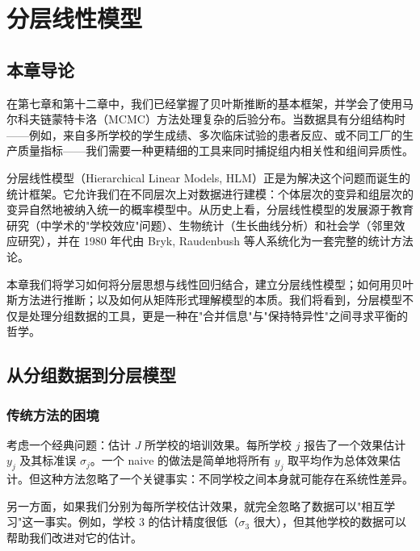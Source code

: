 
\chapter{分层线性模型}
\label{ch:hlm}

\section{本章导论}
\label{sec:ch15-intro}

在第七章和第十二章中，我们已经掌握了贝叶斯推断的基本框架，并学会了使用马尔科夫链蒙特卡洛（MCMC）方法处理复杂的后验分布。当数据具有分组结构时——例如，来自多所学校的学生成绩、多次临床试验的患者反应、或不同工厂的生产质量指标——我们需要一种更精细的工具来同时捕捉组内相关性和组间异质性。

分层线性模型（Hierarchical Linear Models, HLM）正是为解决这个问题而诞生的统计框架。它允许我们在不同层次上对数据进行建模：个体层次的变异和组层次的变异自然地被纳入统一的概率模型中。从历史上看，分层线性模型的发展源于教育研究（中学术的"学校效应"问题）、生物统计（生长曲线分析）和社会学（邻里效应研究），并在 1980 年代由 Bryk, Raudenbush 等人系统化为一套完整的统计方法论。

本章我们将学习如何将分层思想与线性回归结合，建立分层线性模型；如何用贝叶斯方法进行推断；以及如何从矩阵形式理解模型的本质。我们将看到，分层模型不仅是处理分组数据的工具，更是一种在"合并信息"与"保持特异性"之间寻求平衡的哲学。

\section{从分组数据到分层模型}
\label{sec:grouped-to-hierarchical}

\subsection{传统方法的困境}
\label{sec:traditional-dilemma}

考虑一个经典问题：估计 $J$ 所学校的培训效果。每所学校 $j$ 报告了一个效果估计 $y_j$ 及其标准误 $\sigma_j$。一个 naive 的做法是简单地将所有 $y_j$ 取平均作为总体效果估计。但这种方法忽略了一个关键事实：不同学校之间本身就可能存在系统性差异。

另一方面，如果我们分别为每所学校估计效果，就完全忽略了数据可以"相互学习"这一事实。例如，学校 3 的估计精度很低（$\sigma_3$ 很大），但其他学校的数据可以帮助我们改进对它的估计。

